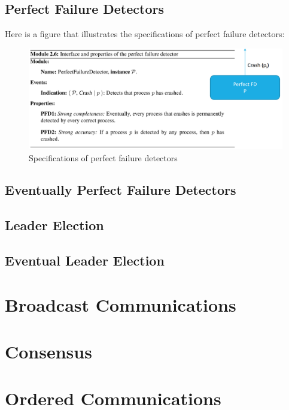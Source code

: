\documentclass{article}
\begin{document}
\subsection{Perfect Failure Detectors}
\label{sec:perfect-failure-detectors}
Here is a figure that illustrates the specifications of perfect failure detectors:
\begin{figure}[h]
	\centering
	\includegraphics[width=0.9\linewidth]{resources/images/chapter 5/Perfect_Failure_Detector_Specifications.png}
	\caption{Specifications of perfect failure detectors}
	\label{fig:perfect-failure-detector-specifications}
\end{figure}

\subsection{Eventually Perfect Failure Detectors}

\subsection{Leader Election}

\subsection{Eventual Leader Election}

\newpage
\section{Broadcast Communications}

\newpage
\section{Consensus}

\newpage
\section{Ordered Communications}
\end{document}
